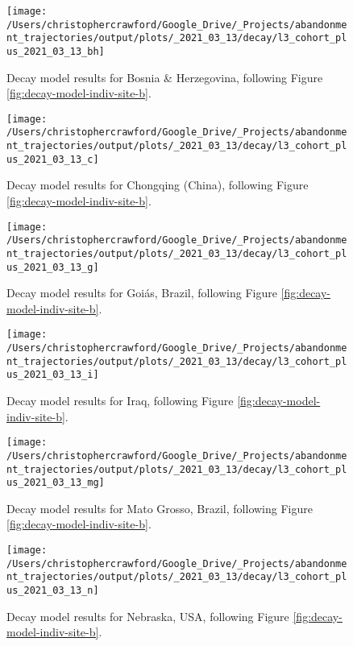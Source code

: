 \documentclass[9pt,twoside,lineno]{pnas-new}
\begin{document}
\begin{figure}
\texttt{[image: /Users/christophercrawford/Google\_Drive/\_Projects/abandonment\_trajectories/output/plots/\_2021\_03\_13/decay/l3\_cohort\_plus\_2021\_03\_13\_bh]} \caption{Decay model results for Bosnia \& Herzegovina, following Figure \ref{fig:decay-model-indiv-site-b}.}\label{fig:decay-model-indiv-site-bh}
\end{figure}

\begin{figure}
\texttt{[image: /Users/christophercrawford/Google\_Drive/\_Projects/abandonment\_trajectories/output/plots/\_2021\_03\_13/decay/l3\_cohort\_plus\_2021\_03\_13\_c]} \caption{Decay model results for Chongqing (China), following Figure \ref{fig:decay-model-indiv-site-b}.}\label{fig:decay-model-indiv-site-c}
\end{figure}

\begin{figure}
\texttt{[image: /Users/christophercrawford/Google\_Drive/\_Projects/abandonment\_trajectories/output/plots/\_2021\_03\_13/decay/l3\_cohort\_plus\_2021\_03\_13\_g]} \caption{Decay model results for Goiás, Brazil, following Figure \ref{fig:decay-model-indiv-site-b}.}\label{fig:decay-model-indiv-site-g}
\end{figure}

\begin{figure}
\texttt{[image: /Users/christophercrawford/Google\_Drive/\_Projects/abandonment\_trajectories/output/plots/\_2021\_03\_13/decay/l3\_cohort\_plus\_2021\_03\_13\_i]} \caption{Decay model results for Iraq, following Figure \ref{fig:decay-model-indiv-site-b}.}\label{fig:decay-model-indiv-site-i}
\end{figure}

\begin{figure}
\texttt{[image: /Users/christophercrawford/Google\_Drive/\_Projects/abandonment\_trajectories/output/plots/\_2021\_03\_13/decay/l3\_cohort\_plus\_2021\_03\_13\_mg]} \caption{Decay model results for Mato Grosso, Brazil, following Figure \ref{fig:decay-model-indiv-site-b}.}\label{fig:decay-model-indiv-site-mg}
\end{figure}

\begin{figure}
\texttt{[image: /Users/christophercrawford/Google\_Drive/\_Projects/abandonment\_trajectories/output/plots/\_2021\_03\_13/decay/l3\_cohort\_plus\_2021\_03\_13\_n]} \caption{Decay model results for Nebraska, USA, following Figure \ref{fig:decay-model-indiv-site-b}.}\label{fig:decay-model-indiv-site-n}
\end{figure}
\end{document}
